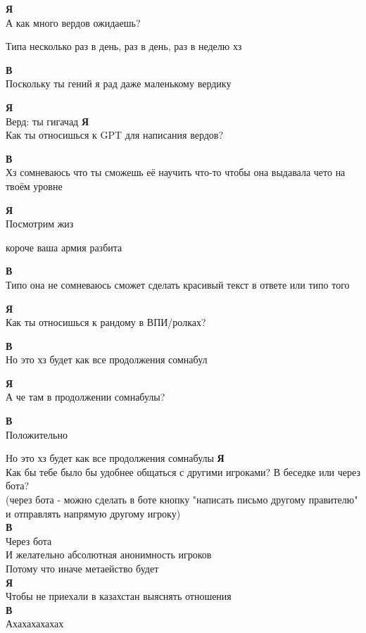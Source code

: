 \textbf{Я} \\
А как много вердов ожидаешь?

Типа несколько раз в день, раз в день, раз в неделю хз

\textbf{В} \\
Поскольку ты гений я рад даже маленькому вердику

\textbf{Я} \\
Верд: ты гигачад
\textbf{Я} \\
Как ты относишься к GPT для написания вердов?

\textbf{В} \\
Хз сомневаюсь что ты сможешь её научить что-то чтобы она выдавала чето на твоём уровне

\textbf{Я} \\
Посмотрим жиз

короче ваша армия разбита

\textbf{В} \\
Типо она не сомневаюсь сможет сделать красивый текст в ответе или типо того

\textbf{Я} \\
Как ты относишься к рандому в ВПИ/ролках?

\textbf{В} \\
Но это хз будет как все продолжения сомнабул

\textbf{Я} \\
А че там в продолжении сомнабулы?

\textbf{В} \\
Положительно

Но это хз будет как все продолжения сомнабулы
\textbf{Я} \\
Как бы тебе было бы удобнее общаться с другими игроками? В беседке или через бота?\\
(через бота - можно сделать в боте кнопку "написать письмо другому правителю" и отправлять напрямую другому игроку)\\

\textbf{В} \\
Через бота\\
И желательно абсолютная анонимность игроков\\

Потому что иначе метаейство будет\\

\textbf{Я} \\
Чтобы не приехали в казахстан выяснять отношения\\

\textbf{В} \\
Ахахахахахах

